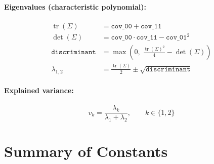 \documentclass[11pt,a4paper]{article}
\begin{document}
\paragraph{Eigenvalues (characteristic polynomial):}
\begin{align}
  \operatorname{tr}(\Sigma) &= \texttt{cov\_00} + \texttt{cov\_11} \\
  \det(\Sigma) &= \texttt{cov\_00}\cdot\texttt{cov\_11} - \texttt{cov\_01}^2 \\[4pt]
  \texttt{discriminant} &= \max\!\left(0,\;\frac{\operatorname{tr}(\Sigma)^2}{4} - \det(\Sigma)\right) \\[6pt]
  \lambda_{1,2} &= \frac{\operatorname{tr}(\Sigma)}{2} \pm \sqrt{\texttt{discriminant}}
\end{align}

\paragraph{Explained variance:}
\begin{equation}
  v_k = \frac{\lambda_k}{\lambda_1 + \lambda_2}, \qquad k \in \{1,2\}
\end{equation}

\section{Summary of Constants}
\end{document}

